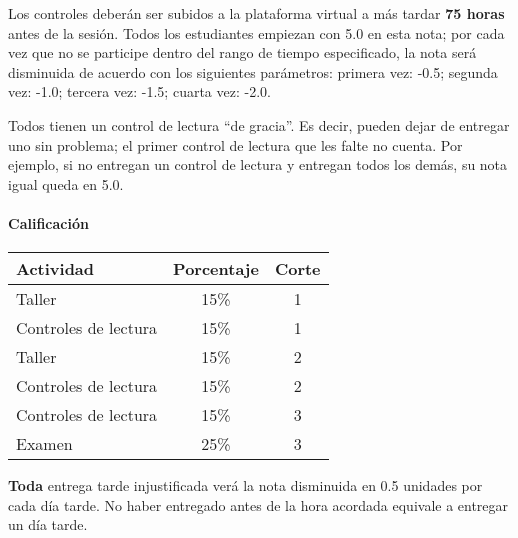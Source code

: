 \documentclass[spanish,]{article}
\let\oldparagraph\paragraph
\renewcommand{\paragraph}[1]{\oldparagraph{#1}\mbox{}}
\begin{document}
Los controles deberán ser subidos a la plataforma virtual a más tardar
\textbf{75 horas} antes de la sesión. Todos los estudiantes empiezan con
5.0 en esta nota; por cada vez que no se participe dentro del rango de
tiempo especificado, la nota será disminuida de acuerdo con los
siguientes parámetros: primera vez: -0.5; segunda vez: -1.0; tercera
vez: -1.5; cuarta vez: -2.0.

Todos tienen un control de lectura ``de gracia''. Es decir, pueden dejar
de entregar uno sin problema; el primer control de lectura que les falte
no cuenta. Por ejemplo, si no entregan un control de lectura y entregan
todos los demás, su nota igual queda en 5.0.

\paragraph{\texorpdfstring{\textbf{Calificación}}{Calificación}}\label{calificacion}


\begin{table}[h]
\begin{tabular}{|l|c|c|}
	\hline
	
\textbf{Actividad}            & \textbf{Porcentaje} & \textbf{Corte} \\
\hline
Taller               & 15\%       & 1     \\
Controles de lectura & 15\%       & 1     \\
Taller               & 15\%       & 2     \\
Controles de lectura & 15\%       & 2     \\
Controles de lectura & 15\%       & 3     \\
Examen               & 25\%       & 3    \\
\hline

\end{tabular}
\end{table}

\textbf{Toda} entrega tarde injustificada verá la nota disminuida en 0.5
unidades por cada día tarde. No haber entregado antes de la hora
acordada equivale a entregar un día tarde.
\end{document}
